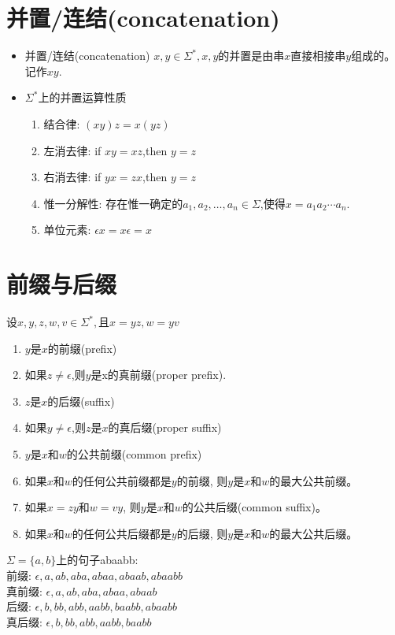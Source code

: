 \section{并置/连结(concatenation)}
\begin{itemize}
	\item 并置/连结(concatenation)
	\subitem{-} $x,y\in \Sigma^{\ast},x,y$的并置是由串$x$直接相接串$y$组成的。记作$xy$.
	\item $\Sigma^{\ast}$上的并置运算性质
	\begin{enumerate}
		\item 结合律: $(xy)z=x(yz)$
		\item 左消去律: if $xy=xz$,then $y=z$
		\item 右消去律: if $yx=zx$,then $y=z$
		\item 惟一分解性: 存在惟一确定的$a_1,a_2,\dots,a_n \in \Sigma$,使得$x=a_1a_2\cdots a_n$.
		\item 单位元素: $\epsilon x=x\epsilon=x$
	\end{enumerate} 
\end{itemize}

\section{前缀与后缀}
设$x,y,z,w,v\in \Sigma^{\ast},$且$x=yz,w=yv$
\begin{enumerate}
	\item $y$是$x$的前缀(prefix)
	\item 如果$z\ne \epsilon$,则$y$是x的真前缀(proper prefix).
	\item $z$是$x$的后缀(suffix)
	\item 如果$y\ne \epsilon$,则$z$是$x$的真后缀(proper suffix)
	\item $y$是$x$和$w$的公共前缀(common prefix)
	\item 如果$x$和$w$的任何公共前缀都是$y$的前缀, 则$y$是$x$和$w$的最大公共前缀。
	\item 如果$x=zy$和$w=vy$, 则$y$是$x$和$w$的公共后缀(common suffix)。
	\item 如果$x$和$w$的任何公共后缀都是$y$的后缀, 则$y$是$x$和$w$的最大公共后缀。
\end{enumerate}

\begin{example}
	$\Sigma = \{a,b\}$上的句子abaabb:\\
	前缀: $\epsilon,a,ab,aba,abaa,abaab,abaabb$ \\
	真前缀: $\epsilon,a,ab,aba,abaa,abaab$ \\
	后缀: $\epsilon,b,bb,abb,aabb,baabb,abaabb$ \\
	真后缀: $\epsilon,b,bb,abb,aabb,baabb$
\end{example}


